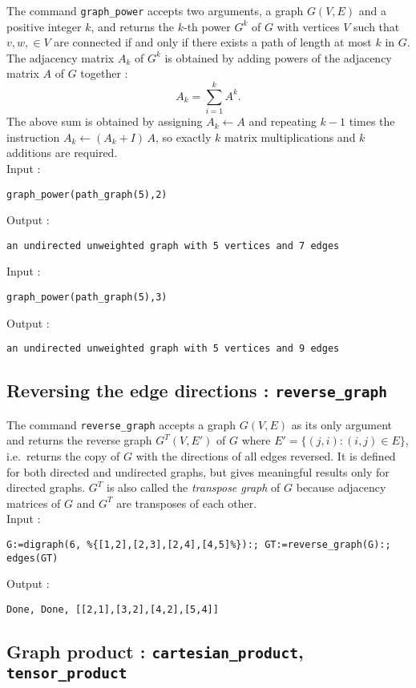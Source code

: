 \documentclass[a4paper,11pt]{article}
\begin{document}
The command {\tt graph\_power} accepts two arguments, a graph $ G(V,E) $ and a positive integer $ k $, and returns the $ k $-th power $ G^k $ of $ G $ with vertices $ V $ such that $ v,w,\in V $ are connected if and only if there exists a path of length at most $ k $ in $ G $. The adjacency matrix $ A_k $ of $ G^k $ is obtained by adding powers of the adjacency matrix $ A $ of $ G $ together :
\[ A_k=\sum_{i=1}^k A^k. \]
The above sum is obtained by assigning $ A_k\leftarrow A $ and repeating $ k-1 $ times the instruction $ A_k\leftarrow (A_k+I)\,A $, so exactly $ k $ matrix multiplications and $ k $ additions are required.\\
Input :
\begin{center}
  \tt graph\_power(path\_graph(5),2)
\end{center}
Output :
\begin{center}
  \tt an undirected unweighted graph with 5 vertices and 7 edges
\end{center}
Input :
\begin{center}
  \tt graph\_power(path\_graph(5),3)
\end{center}
Output :
\begin{center}
  \tt an undirected unweighted graph with 5 vertices and 9 edges
\end{center}

\subsection{Reversing the edge directions : {\tt reverse\_graph}}

The command {\tt reverse\_graph} accepts a graph $ G(V,E) $ as its only argument and returns the reverse graph $ G^T(V,E') $ of $ G $ where $ E'=\{(j,i):(i,j)\in E\} $, i.e.~returns the copy of $ G $ with the directions of all edges reversed. It is defined for both directed and undirected graphs, but gives meaningful results only for directed graphs. $ G^T $ is also called the \emph{transpose graph} of $ G $ because adjacency matrices of $ G $ and $ G^T $ are transposes of each other.\\
Input :
\begin{center}
  \tt G:=digraph(6, \%\{[1,2],[2,3],[2,4],[4,5]\%\}):; GT:=reverse\_graph(G):; edges(GT)
\end{center}
Output :
\begin{center}
  \tt Done, Done, [[2,1],[3,2],[4,2],[5,4]]
\end{center}

\subsection{Graph product : {\tt cartesian\_product}, {\tt tensor\_product}}
\end{document}
